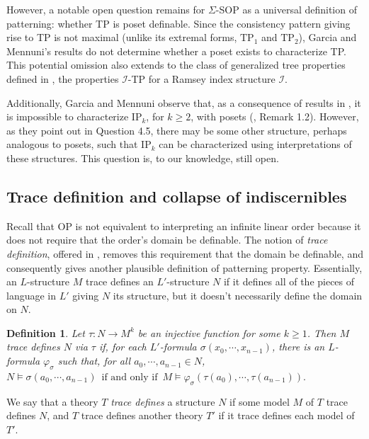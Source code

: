 \documentclass[10pt,a4paper]{amsart}
\newcommand{\calI}{\mathcal{I}}
\newcommand{\TPi}{\text{TP}_1}
\newcommand{\TPii}{\text{TP}_2}
\newcommand{\IFF}{\enspace\text{if and only if}\enspace}
\newcommand{\vphi}{\varphi}
\newtheorem{definition}{Definition}
\begin{document}
However, a notable open question remains for $\Sigma$-SOP as a universal definition of patterning: whether TP is poset definable. Since the consistency pattern giving rise to TP is not maximal (unlike its extremal forms, $\TPi$ and $\TPii$), Garcia and Mennuni's results do not determine whether a poset exists to characterize TP. This potential  omission also extends to the class of generalized tree properties defined in \cite{day2025results}, the properties $\calI$-TP for a Ramsey index structure $\calI$. 


Additionally, Garcia and Mennuni observe that, as a consequence of results in \cite{chernikov2019n}, it is impossible to characterize $\text{IP}_k$, for $k\geq 2$, with posets (\cite{garcia2022model}, Remark 1.2). However, as they point out in Question 4.5, there may be some other structure, perhaps analogous to posets, such that $\text{IP}_k$ can be characterized using interpretations of these structures. This question is, to our knowledge, still open.

\subsection{Trace definition and collapse of indiscernibles}


Recall that OP is not equivalent to interpreting an infinite linear order because it does not require that the order's domain be definable. The notion of \textit{trace definition}, offered in \cite{walsberg2025trace}, removes this requirement that the domain be definable, and consequently gives another plausible definition of patterning property. Essentially, an $L$-structure $M$ trace defines an $L'$-structure $N$ if it defines all of the pieces of language in $L'$ giving $N$ its structure, but it doesn't necessarily define the domain on $N$.
\begin{definition}\label{trace defn defn}
     Let $\tau\colon N\to M^k$ be an injective function for some $k \geq 1$. Then $M$ \textit{trace defines} $N$ via $\tau$ if, for each $L'$-formula $\sigma(x_0,\dotsm, x_{n-1})$, there is an $L$-formula $\vphi_\sigma$ such that, for all $a_0,\dotsm, a_{n-1}\in N$, $N\models \sigma(a_0,\dotsm, a_{n-1}) \IFF M\models \vphi_\sigma(\tau(a_0),\dotsm,\tau(a_{n-1})).$
\end{definition}
We say that a theory $T$ \textit{trace defines} a structure $N$ if some model $M$ of $T$ trace defines $N$, and $T$ trace defines another theory $T'$ if it trace defines each model of $T'$.
\end{document}
